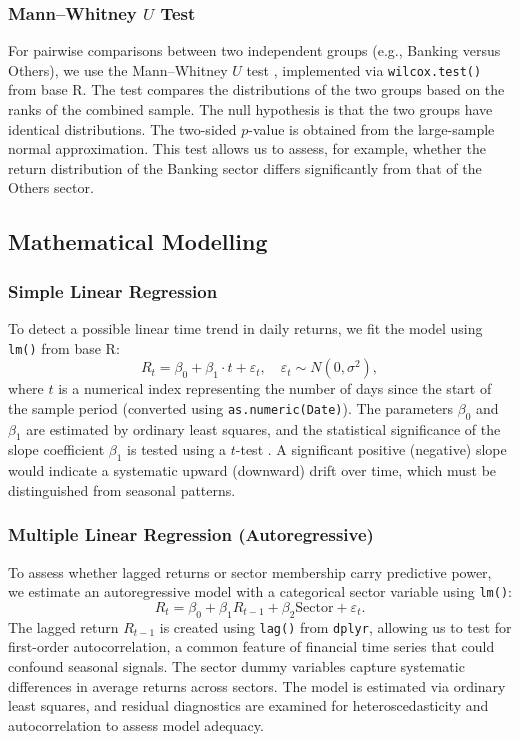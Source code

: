 \documentclass[12pt,a4paper,fleqn]{article}
\begin{document}
\subsubsection{Mann–Whitney \(U\) Test}

For pairwise comparisons between two independent groups (e.g., Banking versus Others), we use the Mann–Whitney \(U\) test \cite{mann1947test}, implemented via \texttt{wilcox.test()} from base R. The test compares the distributions of the two groups based on the ranks of the combined sample. The null hypothesis is that the two groups have identical distributions. The two-sided \(p\)-value is obtained from the large-sample normal approximation. This test allows us to assess, for example, whether the return distribution of the Banking sector differs significantly from that of the Others sector.

\subsection{Mathematical Modelling}

\subsubsection{Simple Linear Regression}

To detect a possible linear time trend in daily returns, we fit the model using \texttt{lm()} from base R:
\[
R_t = \beta_0 + \beta_1 \cdot t + \varepsilon_t,\quad \varepsilon_t \sim N(0,\sigma^2),
\]
where \(t\) is a numerical index representing the number of days since the start of the sample period (converted using \texttt{as.numeric(Date)}). The parameters \(\beta_0\) and \(\beta_1\) are estimated by ordinary least squares, and the statistical significance of the slope coefficient \(\beta_1\) is tested using a \(t\)-test \cite{draper1998applied}. A significant positive (negative) slope would indicate a systematic upward (downward) drift over time, which must be distinguished from seasonal patterns.

\subsubsection{Multiple Linear Regression (Autoregressive)}

To assess whether lagged returns or sector membership carry predictive power, we estimate an autoregressive model with a categorical sector variable using \texttt{lm()}:
\[
R_t = \beta_0 + \beta_1 R_{t-1} + \beta_2 \text{Sector} + \varepsilon_t.
\]
The lagged return \(R_{t-1}\) is created using \texttt{lag()} from \texttt{dplyr}, allowing us to test for first-order autocorrelation, a common feature of financial time series that could confound seasonal signals. The sector dummy variables capture systematic differences in average returns across sectors. The model is estimated via ordinary least squares, and residual diagnostics are examined for heteroscedasticity and autocorrelation to assess model adequacy.
\end{document}
